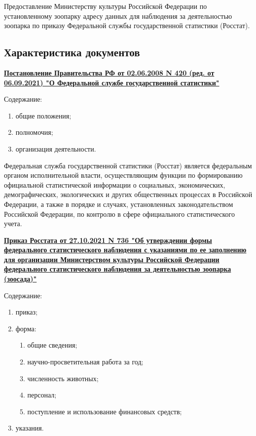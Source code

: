 \documentclass[10pt, a4paper, titlepage]{article}
\begin{document}
Предоставление Министерству культуры Российской Федерации по установленному зоопарку адресу данных для наблюдения за деятельностью зоопарка по приказу Федеральной службы государственной статистики (Росстат).

\subsection{Характеристика документов}

\href{https://student2.consultant.ru/cgi/online.cgi?req=doc&rnd=z4Vbg&base=LAW&n=394985&dst=100032&field=134#fU2wi2Tgqg0mxQc4}{\textbf{Постановление Правительства РФ от 02.06.2008 N 420 (ред. от 06.09.2021) "О Федеральной службе государственной статистики"}}

Содержание:
\begin{enumerate}
    \item общие положения;
    \item полномочия;
    \item организация деятельности.
\end{enumerate}

Федеральная служба государственной статистики (Росстат) является федеральным органом исполнительной власти, осуществляющим функции по формированию официальной статистической информации о социальных, экономических, демографических, экологических и других общественных процессах в Российской Федерации, а также в порядке и случаях, установленных законодательством Российской Федерации, по контролю в сфере официального статистического учета.

\href{https://student2.consultant.ru/cgi/online.cgi?req=doc&rnd=XbcvLw&base=LAW&n=399590&dst=100013&field=134#2855r1TgPC7pc4QA1}{\textbf{Приказ Росстата от 27.10.2021 N 736 "Об утверждении формы федерального статистического наблюдения с указаниями по ее заполнению для организации Министерством культуры Российской Федерации федерального статистического наблюдения за деятельностью зоопарка (зоосада)"}}

Содержание:
\begin{enumerate}
    \item приказ;
    
    \item форма:
    \begin{enumerate}
        \item общие сведения;
        
        \item научно-просветительная работа за год;
        
        \item численность животных;
        
        \item персонал;
        
        \item поступление и использование финансовых средств;
        
    \end{enumerate}
    
    \item указания.
\end{enumerate}
\end{document}
